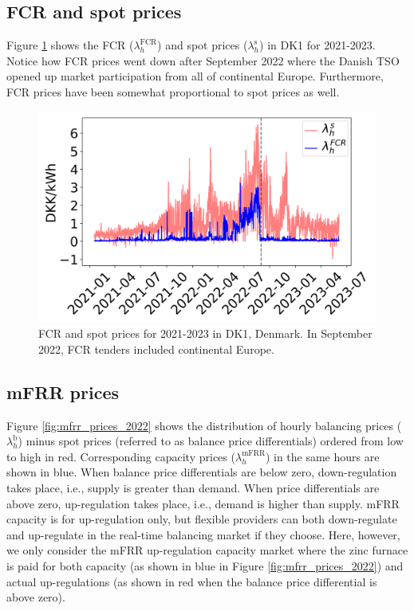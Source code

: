 \documentclass[sigconf]{acmart}
\begin{document}
\subsection{FCR and spot prices}

Figure \ref{fig:fcr_prices_2022} shows the FCR ($\lambda_{h}^{\text{FCR}}$) and spot prices ($\lambda_{h}^{\text{s}}$) in DK1 for 2021-2023. Notice how FCR prices went down after September 2022 where the Danish TSO opened up market participation from all of continental Europe. Furthermore, FCR prices have been somewhat proportional to spot prices as well.

\begin{figure}[t]
    \centering
    \includegraphics[width=\columnwidth]{figures/fcr_prices.png}
    \caption{FCR and spot prices for 2021-2023 in DK1, Denmark. In September 2022, FCR tenders included continental Europe.}
    \label{fig:fcr_prices_2022}
\end{figure}

\subsection{mFRR prices}

Figure \ref{fig:mfrr_prices_2022} shows the distribution of hourly balancing prices ($\lambda_{h}^{\text{b}}$) minus spot prices (referred to as balance price differentials) ordered from low to high in red. Corresponding capacity prices ($\lambda_{h}^{\text{mFRR}}$) in the same hours are shown in blue. When balance price differentials are below zero, down-regulation takes place, i.e., supply is greater than demand. When price differentials are above zero, up-regulation takes place, i.e., demand is higher than supply. mFRR capacity is for up-regulation only, but flexible providers can both down-regulate and up-regulate in the real-time balancing market if they choose. Here, however, we only consider the mFRR up-regulation capacity market where the zinc furnace is paid for both capacity (as shown in blue in Figure \ref{fig:mfrr_prices_2022}) and actual up-regulations (as shown in red when the balance price differential is above zero).
\end{document}
